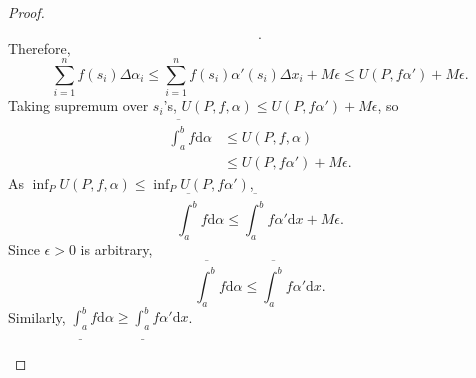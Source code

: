 \begin{thm}[17]
\begin{proof}
\begin{enumerate}[label=(\roman*)]
\[				      .\]
			      Therefore,
			      \[
				      \sum_{i=1}^{n}{f(s_i)\Delta \alpha_i}\le \sum_{i=1}^{n}{f(s_i)\alpha'(s_i)\Delta x_i+M\epsilon}\le U(P,f\alpha')+M \epsilon
				      .\]
			      Taking supremum over $s_i$'s, $U(P,f,\alpha)\le U(P,f\alpha')+M \epsilon$, so
			      \begin{align*}
				      \overline{\int_{a}^{b}}{f\mathrm{d}\alpha} & \le U(P,f,\alpha)             \\
				                                                 & \le U(P,f\alpha')+M \epsilon.
			      \end{align*}
			      As $\inf_{P}U(P,f,\alpha)\le \inf_{P}U(P,f\alpha')$,
			      \[
				      \overline{\int_{a}^{b}}{f\mathrm{d}\alpha}\le \overline{\int_{a}^{b}}{f \alpha'\mathrm{d}x} +M \epsilon
				      .\]
			      Since $\epsilon>0$ is arbitrary,
			      \[
				      \overline{\int_{a}^{b}}{f\mathrm{d}\alpha}\le \overline{\int_{a}^{b}}{f\alpha'\mathrm{d}x}
				      .\]
			      Similarly, $\underline{\int_{a}^{b}}{f\mathrm{d}\alpha}\ge \underline{\int_{a}^{b}}{f\alpha'\mathrm{d}x}$.
		\end{enumerate}
	\end{proof}
\end{thm}

